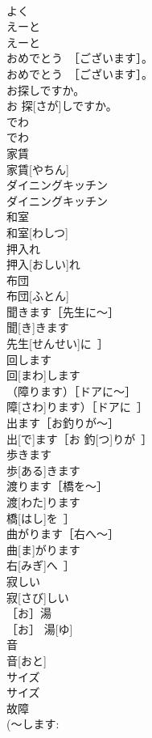 \documentclass[8pt]{extreport}
\begin{document}
\begin{CJK}{UTF8}{min}
\\	よく	
\\	えーと	
\\	えーと	
\\	おめでとう　［ございます］。	
\\	おめでとう　［ございます］。	
\\	お探しですか。	
\\	お 探[さが]しですか。	
\\	でわ	
\\	でわ	
\\	家賃	
\\	家賃[やちん]	
\\	ダイニングキッチン	
\\	ダイニングキッチン	
\\	和室	
\\	和室[わしつ]	
\\	押入れ	
\\	押入[おしい]れ	
\\	布団	
\\	布団[ふとん]	
\\	聞きます［先生に～］	
\\	聞[き]きます
\\	先生[せんせい]に~］	
\\	回します	
\\	回[まわ]します	
\\	（障ります）［ドアに～］	
\\	障[さわ]ります）［ドアに~］	
\\	出ます［お釣りが～］	
\\	出[で]ます［お 釣[つ]りが~］	
\\	歩きます	
\\	歩[ある]きます	
\\	渡ります［橋を～］	
\\	渡[わた]ります
\\	橋[はし]を~］	
\\	曲がります［右へ～］	
\\	曲[ま]がります
\\	右[みぎ]へ~］	
\\	寂しい	
\\	寂[さび]しい	
\\	［お］湯	
\\	［お］ 湯[ゆ]	
\\	音	
\\	音[おと]	
\\	サイズ	
\\	サイズ	
\\	故障	
\\	(～します: 

\end{CJK}
\end{document}

